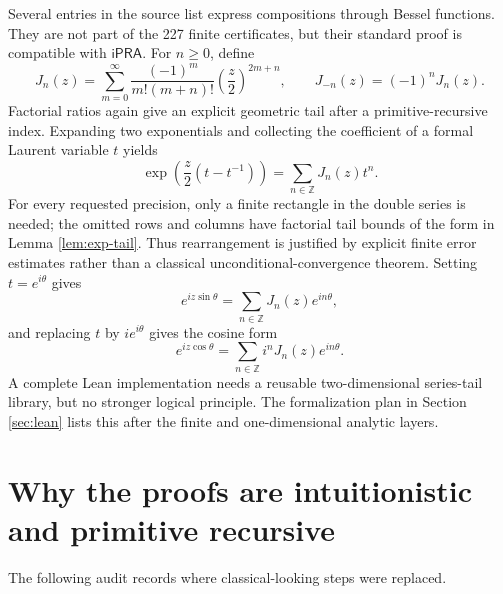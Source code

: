 \documentclass[11pt]{article}
\theoremstyle{definition}
\newcommand{\Z}{\mathbb Z}
\newcommand{\iPRA}{\mathsf{iPRA}}
\begin{document}
Several entries in the source list express compositions through Bessel
functions.  They are not part of the 227 finite certificates, but their standard
proof is compatible with \(\iPRA\).  For \(n\ge0\), define
\[
 J_n(z)=\sum_{m=0}^\infty
 \frac{(-1)^m}{m!(m+n)!}\left(\frac z2\right)^{2m+n},
 \qquad J_{-n}(z)=(-1)^nJ_n(z).
 \tag{16.1}
\]
Factorial ratios again give an explicit geometric tail after a
primitive-recursive index.  Expanding two exponentials and collecting the
coefficient of a formal Laurent variable \(t\) yields
\[
 \exp\left(\frac z2(t-t^{-1})\right)
 =\sum_{n\in\Z}J_n(z)t^n.
 \tag{16.2}
\]
For every requested precision, only a finite rectangle in the double series is
needed; the omitted rows and columns have factorial tail bounds of the form in
Lemma \ref{lem:exp-tail}.  Thus rearrangement is justified by explicit finite
error estimates rather than a classical unconditional-convergence theorem.
Setting \(t=e^{i\theta}\) gives
\[
 e^{iz\sin\theta}=\sum_{n\in\Z}J_n(z)e^{in\theta},
 \tag{16.3}
\]
and replacing \(t\) by \(ie^{i\theta}\) gives the cosine form
\[
 e^{iz\cos\theta}=\sum_{n\in\Z}i^nJ_n(z)e^{in\theta}.
 \tag{16.4}
\]
A complete Lean implementation needs a reusable two-dimensional series-tail
library, but no stronger logical principle.  The formalization plan in
Section \ref{sec:lean} lists this after the finite and one-dimensional analytic
layers.

\section{Why the proofs are intuitionistic and primitive recursive}
\label{sec:logical-audit}

The following audit records where classical-looking steps were replaced.
\end{document}

